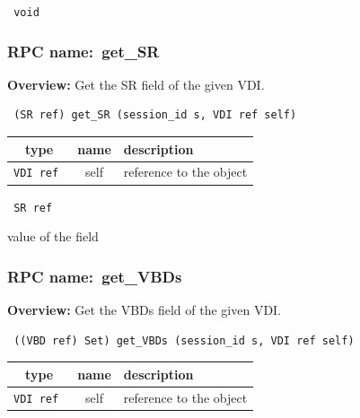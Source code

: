 \vspace{0.3cm}

{\tt 
void
}



\vspace{0.3cm}
\vspace{0.3cm}
\vspace{0.3cm}
\subsubsection{RPC name:~get\_SR}

{\bf Overview:} 
Get the SR field of the given VDI.

\begin{verbatim} (SR ref) get_SR (session_id s, VDI ref self)\end{verbatim}



 
\vspace{0.3cm}
\begin{tabular}{|c|c|p{7cm}|}
 \hline
{\bf type} & {\bf name} & {\bf description} \\ \hline
{\tt VDI ref } & self & reference to the object \\ \hline 

\end{tabular}

\vspace{0.3cm}

{\tt 
SR ref
}


value of the field
\vspace{0.3cm}
\vspace{0.3cm}
\vspace{0.3cm}
\subsubsection{RPC name:~get\_VBDs}

{\bf Overview:} 
Get the VBDs field of the given VDI.

\begin{verbatim} ((VBD ref) Set) get_VBDs (session_id s, VDI ref self)\end{verbatim}



 
\vspace{0.3cm}
\begin{tabular}{|c|c|p{7cm}|}
 \hline
{\bf type} & {\bf name} & {\bf description} \\ \hline
{\tt VDI ref } & self & reference to the object \\ \hline 

\end{tabular}

